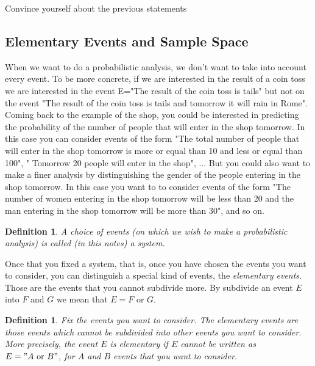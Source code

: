 \documentclass[12pt]{article}
\newtheorem{definition}[theorem]{Definition}
\newcommand{\<}{{\langle \!\! \langle}}
\renewcommand{\>}{{\rangle \!\! \rangle}}
\begin{document}
\begin{exercise}
Convince yourself about the previous statements
\end{exercise}   
 

\subsection{Elementary Events and Sample Space}

When we want to do a probabilistic analysis, we don't want to take into account every event. To be more concrete, if we are interested in the result of a coin toss we are interested in the event E="The result of the coin toss is tails" but not on the event "The result of the coin toss is tails and tomorrow it will rain in Rome".\\
 Coming back to the example of the shop, you could be interested in predicting the probability of the number of people that will enter in the shop tomorrow. In this case you can consider events of the form "The total number of people that will enter in the shop tomorrow is more or equal than 10 and less or equal than 100", " Tomorrow 20 people will enter in the shop", ... But you could also  want to make a finer analysis by distinguishing the gender of the people entering in the shop tomorrow. In this case you want to to consider events of the form "The number of women entering in the shop tomorrow will be less than 20 and the man entering in the shop tomorrow will be more than 30", and so on.

\begin{definition}
	A choice of events (on which we wish to make a probabilistic analysis) is called (in this notes) a system. 
\end{definition}

 Once that you fixed a system, that is, once you have chosen the events you want to consider, you can distinguish a special kind of events, the \emph{elementary events}. Those are the events that you cannot subdivide more. By subdivide an event $E$ into $F$ and $G$ we mean that $E= F \textrm{ or } G$.\\  

\begin{definition}
	Fix the events you want to consider. The elementary events are those events  which cannot be subdivided into other events you want to consider. More precisely, the event $E$ is elementary if $E$ cannot be written as $E= "A\textrm{ or } B"$, for $A$ and $B$ events that you want to consider.  
\end{definition}
\end{document}
